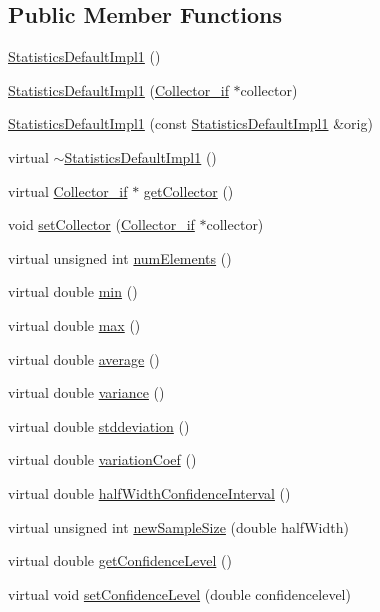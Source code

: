\subsection*{Public Member Functions}
\begin{DoxyCompactItemize}
\item 
\hyperlink{class_statistics_default_impl1_a9ad8b52ec53fcfe26e8c172b0616e867}{Statistics\+Default\+Impl1} ()
\item 
\hyperlink{class_statistics_default_impl1_ae550b67358adc75d57ce9eb3e5f842ae}{Statistics\+Default\+Impl1} (\hyperlink{class_collector__if}{Collector\+\_\+if} $\ast$collector)
\item 
\hyperlink{class_statistics_default_impl1_a2c32c55c8821e93c10472d291310f28e}{Statistics\+Default\+Impl1} (const \hyperlink{class_statistics_default_impl1}{Statistics\+Default\+Impl1} \&orig)
\item 
virtual \hyperlink{class_statistics_default_impl1_a0d2847b2fa7c7469d25c3359a9995d6c}{$\sim$\+Statistics\+Default\+Impl1} ()
\item 
virtual \hyperlink{class_collector__if}{Collector\+\_\+if} $\ast$ \hyperlink{class_statistics_default_impl1_aaded347086e5510d2b429aabd4b29117}{get\+Collector} ()
\item 
void \hyperlink{class_statistics_default_impl1_a356b96434f96963340ad6a64e72d2287}{set\+Collector} (\hyperlink{class_collector__if}{Collector\+\_\+if} $\ast$collector)
\item 
virtual unsigned int \hyperlink{class_statistics_default_impl1_a3ad348a8f7f6c787bae7bd047778732f}{num\+Elements} ()
\item 
virtual double \hyperlink{class_statistics_default_impl1_abe3c2ecfecf1f41c3e234c4837ebf958}{min} ()
\item 
virtual double \hyperlink{class_statistics_default_impl1_ac5880adb2aa226ca0049619d4c8f9055}{max} ()
\item 
virtual double \hyperlink{class_statistics_default_impl1_a9d455901cf69ec5acb7f8d22f6cf6e7d}{average} ()
\item 
virtual double \hyperlink{class_statistics_default_impl1_af4f4f87081443d4316db24d41b1815ea}{variance} ()
\item 
virtual double \hyperlink{class_statistics_default_impl1_a4f456241bc3340e04e688652fcad8037}{stddeviation} ()
\item 
virtual double \hyperlink{class_statistics_default_impl1_a6cf660daca8ad4144e080dccaf33a282}{variation\+Coef} ()
\item 
virtual double \hyperlink{class_statistics_default_impl1_a6305be6a663af6d01bcf8b1517be06a0}{half\+Width\+Confidence\+Interval} ()
\item 
virtual unsigned int \hyperlink{class_statistics_default_impl1_a08a59890f738459d9b822d948b02b23c}{new\+Sample\+Size} (double half\+Width)
\item 
virtual double \hyperlink{class_statistics_default_impl1_a6b7260a7dc9064a59c21d2812cdba4a7}{get\+Confidence\+Level} ()
\item 
virtual void \hyperlink{class_statistics_default_impl1_a180488f21098944d1bc64233bf7aba6d}{set\+Confidence\+Level} (double confidencelevel)
\end{DoxyCompactItemize}


